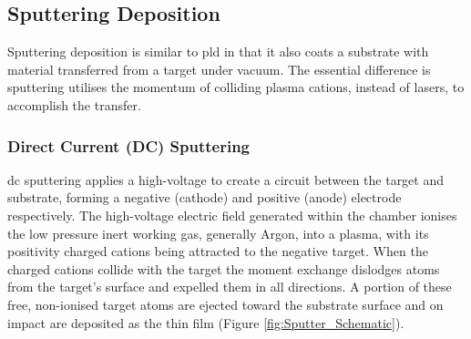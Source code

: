 \documentclass[a4paper,12pt,oneside]{report}%
\begin{document}
\subsection{Sputtering Deposition}
Sputtering deposition is similar to \gls{pld} in that it also coats a substrate with material transferred from a target under vacuum. The essential difference is sputtering utilises the momentum of colliding plasma cations, instead of lasers, to accomplish the transfer. 

\subsubsection{Direct Current (DC) Sputtering} 
\Gls{dc} sputtering applies a high-voltage to create a circuit between the target and substrate, forming a negative (cathode) and positive (anode) electrode respectively. The high-voltage electric field generated within the chamber ionises the low pressure inert working gas, generally Argon, into a plasma, with its positivity charged cations being attracted to the negative target. When the charged cations collide with the target the moment exchange dislodges atoms from the target's surface and expelled them in all directions. A portion of these free, non-ionised target atoms are ejected toward the substrate surface and on impact are deposited as the thin film (Figure \ref{fig:Sputter_Schematic}). 
\end{document}

